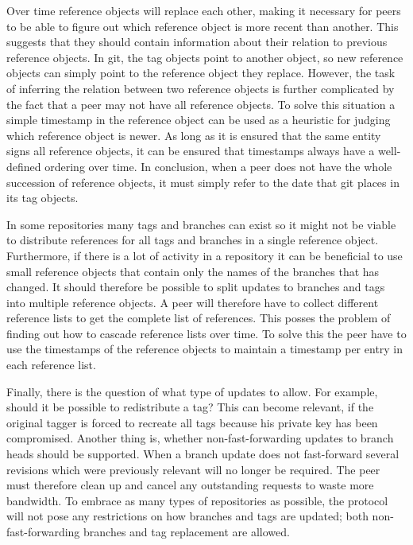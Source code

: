 Over time reference objects will replace each other, making it
necessary for peers to be able to figure out which reference object is
more recent than another. This suggests that they should contain
information about their relation to previous reference objects.  In git, the
tag objects point to another object, so new reference objects
can simply point to the reference object they replace. However, the
task of inferring the relation between two reference objects is further
complicated by the fact that a peer may not have all reference
objects. To solve this situation a simple timestamp in the reference
object can be used as a heuristic for judging which reference object
is newer. As long as it is ensured that the same entity signs all
reference objects, it can be ensured that timestamps always have a
well-defined ordering over time. In conclusion, when a peer does not have the
whole succession of reference objects, it must simply refer to the date that
git places in its tag objects.

In some repositories many tags and branches can exist so it might not
be viable to distribute references for all tags and branches in a
single reference object. Furthermore, if there is a lot of activity in
a repository it can be beneficial to use small reference objects that
contain only the names of the branches that has changed. It should
therefore be possible to split updates to branches and tags into
multiple reference objects. A peer will therefore have to collect
different reference lists to get the complete list of references. This
posses the problem of finding out how to cascade reference lists over
time. To solve this the peer have to use the timestamps of the
reference objects to maintain a timestamp per entry in each reference
list.


Finally, there is the question of what type of updates to allow. For
example, should it be possible to redistribute a tag? This can become
relevant, if the original tagger is forced to recreate all tags
because his private key has been compromised. Another thing is, whether
non-fast-forwarding updates to branch heads should be supported.  When
a branch update does not fast-forward several revisions which were
previously relevant will no longer be required. The peer must
therefore clean up and cancel any outstanding requests to waste more
bandwidth. To embrace as many types of repositories as possible, the
protocol will not pose any restrictions on how branches and tags are
updated; both non-fast-forwarding branches and tag replacement are
allowed.

